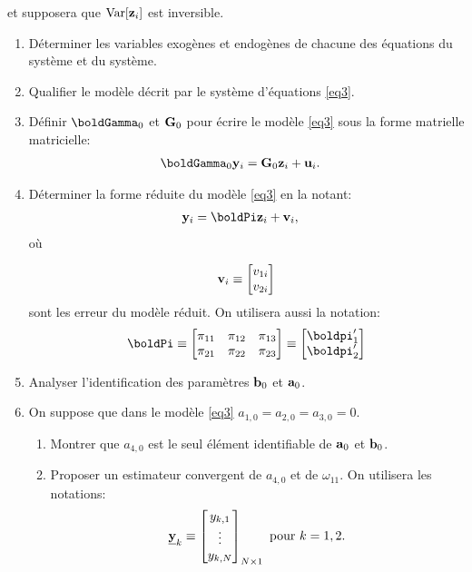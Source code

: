     et supposera que $\operatorname{Var}[{\mathbf z}_i]$ est inversible.
\begin{enumerate}
    \item Déterminer les variables exogènes et endogènes de chacune des équations
    du système et du système.
    \item Qualifier le modèle décrit par le système d’équations \eqref{eq3}.
    \item Définir $\boldGamma_0$ et $\mathbf G_0$ pour écrire le modèle \eqref{eq3} sous la forme matrielle matricielle:
    \begin{align*}
    \boldGamma_0\boldy_i&= \boldG_0\boldz_i + \boldu_i.
    \end{align*}
    \item Déterminer la forme réduite du modèle \eqref{eq3} en la notant: 
    \begin{align*}
        \boldy_i &=\boldPi\boldz_i + \boldv_i,
    \end{align*}
où 

\[{\mathbf v}_i \equiv \begin{bmatrix}
v_{1i}\\
v_{2i}
\end{bmatrix}
\]
sont les erreur du modèle réduit. On utilisera aussi la notation:
\[  
    \boldPi \equiv \begin{bmatrix}
        \pi_{11}& \pi_{12}& \pi_{13}\\
        \pi_{21}& \pi_{22}& \pi_{23}
    \end{bmatrix}
    \equiv 
    \begin{bmatrix}
\boldpi_1^\prime\\
\boldpi_2^\prime
    \end{bmatrix}
\]
\item Analyser l’identification des paramètres ${\mathbf b}_0$ et ${\mathbf a}_0$.
\item On suppose que dans le modèle \eqref{eq3} $a_{1,0}= a_{2,0}= a_{3,0}= 0$.
\begin{enumerate}
\item Montrer que $a_{4,0}$ est le seul élément identifiable de ${\mathbf a}_0$ et ${\mathbf b}_0$.  
\item Proposer un estimateur convergent de $a_{4,0}$ et de $\omega_{11}$. On utilisera les notations:
\[
  \underline{{\mathbf y}}_k \equiv
  \begin{bmatrix}
      y_{k, 1}\\
      \vdots\\
      y_{k, N}
  \end{bmatrix}_{N\times 1} 
  \ \text{pour} \ k = 1, 2.
\]


\end{enumerate}
\end{enumerate}
